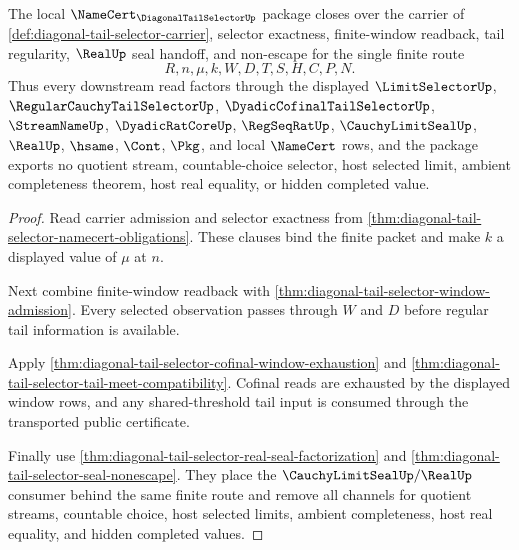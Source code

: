 \begin{theorem}
\label{thm:diagonal-tail-selector-namecert-closure}
The local $\NameCert_{\DiagonalTailSelectorUp}$ package closes over the
carrier of \autoref{def:diagonal-tail-selector-carrier}, selector exactness,
finite-window readback, tail regularity, $\RealUp$ seal handoff, and
non-escape for the single finite route
$$
R,n,\mu,k,W,D,T,S,H,C,P,N.
$$
Thus every downstream read factors through the displayed
$\LimitSelectorUp$, $\RegularCauchyTailSelectorUp$,
$\DyadicCofinalTailSelectorUp$, $\StreamNameUp$, $\DyadicRatCoreUp$,
$\RegSeqRatUp$, $\CauchyLimitSealUp$, $\RealUp$, $\hsame$, $\Cont$, $\Pkg$,
and local $\NameCert$ rows, and the package exports no quotient stream,
countable-choice selector, host selected limit, ambient completeness theorem,
host real equality, or hidden completed value.
\end{theorem}
\begin{proof}
Read carrier admission and selector exactness from
\autoref{thm:diagonal-tail-selector-namecert-obligations}. These clauses bind
the finite packet and make $k$ a displayed value of $\mu$ at $n$.

Next combine finite-window readback with
\autoref{thm:diagonal-tail-selector-window-admission}. Every selected
observation passes through $W$ and $D$ before regular tail information is
available.

Apply \autoref{thm:diagonal-tail-selector-cofinal-window-exhaustion} and
\autoref{thm:diagonal-tail-selector-tail-meet-compatibility}. Cofinal reads
are exhausted by the displayed window rows, and any shared-threshold tail
input is consumed through the transported public certificate.

Finally use \autoref{thm:diagonal-tail-selector-real-seal-factorization} and
\autoref{thm:diagonal-tail-selector-seal-nonescape}. They place the
$\CauchyLimitSealUp/\RealUp$ consumer behind the same finite route and remove
all channels for quotient streams, countable choice, host selected limits,
ambient completeness, host real equality, and hidden completed values.
\end{proof}

